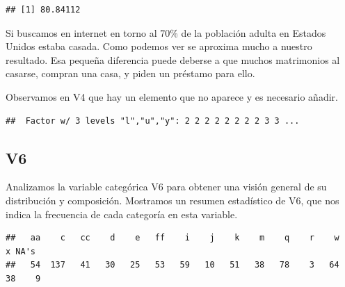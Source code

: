 \documentclass[
]{article}
\newenvironment{Shaded}{\begin{snugshade}}{\end{snugshade}}
\newcommand{\CommentTok}[1]{\textcolor[rgb]{0.56,0.35,0.01}{\textit{#1}}}
\newcommand{\FunctionTok}[1]{\textcolor[rgb]{0.13,0.29,0.53}{\textbf{#1}}}
\newcommand{\NormalTok}[1]{#1}
\newcommand{\SpecialCharTok}[1]{\textcolor[rgb]{0.81,0.36,0.00}{\textbf{#1}}}
\begin{document}
\begin{verbatim}
## [1] 80.84112
\end{verbatim}

Si buscamos en internet en torno al 70\% de la población adulta en
Estados Unidos estaba casada. Como podemos ver se aproxima mucho a
nuestro resultado. Esa pequeña diferencia puede deberse a que muchos
matrimonios al casarse, compran una casa, y piden un préstamo para ello.

Observamos en V4 que hay un elemento que no aparece y es necesario
añadir.

\begin{Shaded}
\end{Shaded}

\begin{verbatim}
##  Factor w/ 3 levels "l","u","y": 2 2 2 2 2 2 2 2 3 3 ...
\end{verbatim}

\hypertarget{v6}{%
\subsection{V6}\label{v6}}

Analizamos la variable categórica V6 para obtener una visión general de
su distribución y composición. Mostramos un resumen estadístico de V6,
que nos indica la frecuencia de cada categoría en esta variable.

\begin{Shaded}
\end{Shaded}

\begin{verbatim}
##   aa    c   cc    d    e   ff    i    j    k    m    q    r    w    x NA's 
##   54  137   41   30   25   53   59   10   51   38   78    3   64   38    9
\end{verbatim}
\end{document}

